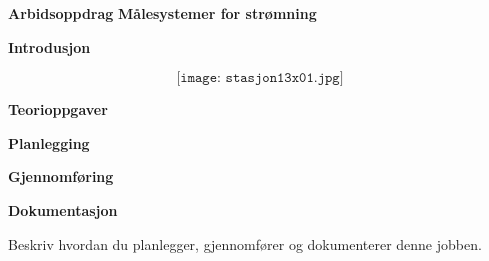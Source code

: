 

\noindent

\vskip 5pt




\vskip 5pt
\begin{center}
\textbf{Arbidsoppdrag}
\vskip 5pt 
\textbf{Målesystemer for strømning}
\end{center}

\vskip 10pt 
\textbf{Introdusjon}

\vskip 5pt 

\vskip 5pt 

$$\texttt{[image: stasjon13x01.jpg]}$$

\vskip 10pt 
\textbf{Teorioppgaver}

\vskip 5pt 

\vskip 10pt 
\textbf{Planlegging}


\vskip 10pt 
\textbf{Gjennomføring}

\vskip 10pt 
\textbf{Dokumentasjon}

Beskriv hvordan du planlegger, gjennomfører og dokumenterer denne jobben. 



















\vfil \eject

















